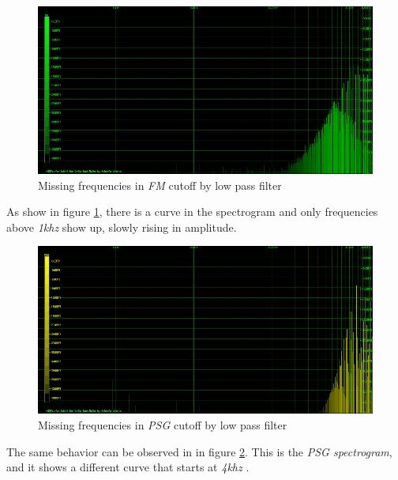 \documentclass[10pt,a4paper]{report}
\newcommand{\fkhz}[1]{\textit{#1\acrshort{khz}}}
\begin{document}
\begin{figure}[H]
	\centering
	\includegraphics[width=1.0\linewidth]{images/interpretation/Plot4-4-Missing-FM.png}
	\caption[Missing FM]{Missing frequencies in \textit{FM} cutoff by low pass filter}
	\label{fig:plot4-4-missing-fm}
\end{figure}

As show in figure \ref{fig:plot4-4-missing-fm}, there is a curve in the spectrogram and only frequencies above \fkhz{1} show up, slowly rising in amplitude.

\begin{figure}[H]
	\centering
	\includegraphics[width=1.0\linewidth]{images/interpretation/Plot4-5-Missing-PSG.png}
	\caption[Missing PSG]{Missing frequencies in \textit{PSG} cutoff by low pass filter}
	\label{fig:plot4-5-missing-psg}
\end{figure}

The same behavior can be observed in in figure \ref{fig:plot4-5-missing-psg}. This is the \textit{PSG spectrogram}, and it shows a different curve that starts at \fkhz{4} .
\end{document}
